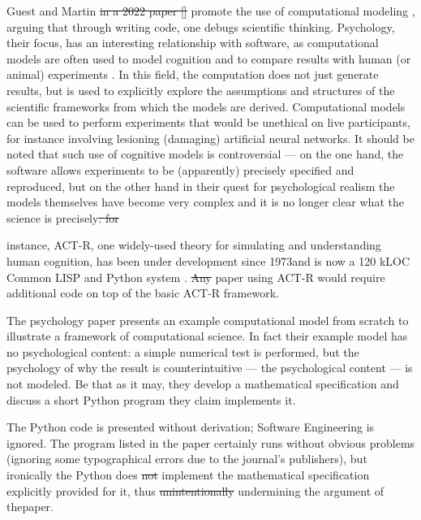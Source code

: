 \documentclass{comjnl}
\providecommand{\DIFadd}[1]{{\protect\color{blue}\uwave{#1}}} %
\providecommand{\DIFdel}[1]{{\protect\color{red}\sout{#1}}}                      %
\providecommand{\DIFaddbegin}{} %
\providecommand{\DIFaddend}{} %
\providecommand{\DIFdelbegin}{} %
\providecommand{\DIFdelend}{} %
\begin{document}
Guest and Martin \DIFdelbegin \DIFdel{in a 2022 paper []
}\DIFdelend promote the use of computational modeling \DIFaddbegin \DIFadd{[]}\DIFaddend , arguing that through writing code, one debugs scientific thinking. Psychology, their focus, has an interesting relationship with software, as computational models are often used to model cognition and to compare results with human (or animal) experiments \cite{psychological-modeling}. In this field, the computation does not just generate results, but is used to explicitly explore the assumptions and structures of the scientific frameworks from which the models are derived. Computational models can be used to perform experiments that would be unethical on live participants, for instance involving lesioning (damaging) artificial neural networks. It should be noted that such use of cognitive models is controversial --- on the one hand, the software allows experiments to be (apparently) precisely specified and reproduced, but on the other hand in their quest for psychological realism the models themselves have become very complex and it is no longer clear what the science is precisely\DIFdelbegin \DIFdel{: for }\DIFdelend \DIFaddbegin \DIFadd{!
}

\DIFadd{For }\DIFaddend instance, ACT-R, one widely-used theory for simulating and understanding human cognition, has been under development since 1973\DIFaddbegin \DIFadd{, }\DIFaddend and is now a 120 kLOC Common LISP and Python system \cite{actr}. \DIFdelbegin \DIFdel{Any }\DIFdelend \DIFaddbegin \DIFadd{Furthermore, any }\DIFaddend paper using ACT-R would require additional code on top of the basic ACT-R framework.

The psychology paper \cite{psychological-modeling} presents an example computational model from scratch to illustrate a framework of computational science. In fact their example model has no psychological content: a simple numerical test is performed, but the psychology of why the result is counterintuitive --- the psychological content --- is not modeled. Be that as it may, they develop a mathematical specification and discuss a short Python program they claim implements it. 

The Python code is presented without derivation; Software Engineering is ignored. The program listed in the paper certainly runs without obvious problems (ignoring some typographical errors due to the journal's publishers), but ironically the Python does \DIFdelbegin \DIFdel{not }\DIFdelend \DIFaddbegin \emph{\DIFadd{not\/}} \DIFaddend implement the mathematical specification explicitly provided for it, thus \DIFdelbegin \DIFdel{unintentionally }\DIFdelend undermining the argument of the\DIFaddbegin \DIFadd{~}\DIFaddend paper. 
\end{document}

